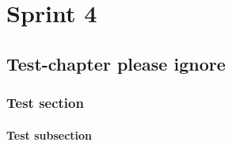 \part{Sprint 4}
\chapter{Test-chapter please ignore}
\section{Test section}
\subsection{Test subsection}